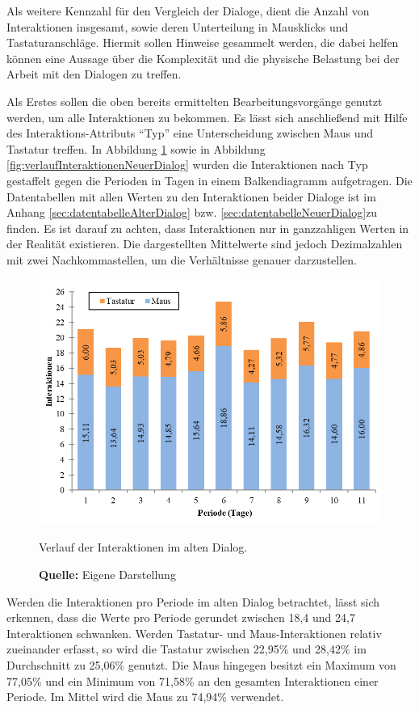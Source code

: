 Als weitere Kennzahl für den Vergleich der Dialoge, dient die Anzahl von Interaktionen insgesamt, sowie deren Unterteilung in Mausklicks und Tastaturanschläge. Hiermit sollen Hinweise gesammelt werden, die dabei helfen können eine Aussage über die Komplexität und die physische Belastung bei der Arbeit mit den Dialogen zu treffen.

Als Erstes sollen die oben bereits ermittelten Bearbeitungsvorgänge genutzt werden, um alle Interaktionen zu bekommen. Es lässt sich anschließend mit Hilfe des Interaktions-Attributs \enquote{Typ} eine Unterscheidung zwischen Maus und Tastatur treffen. In Abbildung \ref{fig:verlaufInteraktionenAlterDialog} sowie in Abbildung \ref{fig:verlaufInteraktionenNeuerDialog} wurden die Interaktionen nach Typ gestaffelt gegen die Perioden in Tagen in einem Balkendiagramm aufgetragen. Die Datentabellen mit allen Werten zu den Interaktionen beider Dialoge ist im Anhang \ref{sec:datentabelleAlterDialog} bzw. \ref{sec:datentabelleNeuerDialog}zu finden. Es ist darauf zu achten, dass Interaktionen nur in ganzzahligen Werten in der Realität existieren. Die dargestellten Mittelwerte sind jedoch Dezimalzahlen mit zwei Nachkommastellen, um die Verhältnisse genauer darzustellen.
\begin{figure}[H]
  \centering
  \includegraphics[]{img/Interaktionen_Alter_Dialog.png}
  \caption{Verlauf der Interaktionen im alten Dialog.}
  \caption*{\textbf{Quelle:} Eigene Darstellung}
  \label{fig:verlaufInteraktionenAlterDialog}
\end{figure}
Werden die Interaktionen pro Periode im alten Dialog betrachtet, lässt sich erkennen, dass die Werte pro Periode gerundet zwischen 18,4 und 24,7 Interaktionen schwanken. Werden Tastatur- und Maus-Interaktionen relativ zueinander erfasst, so wird die Tastatur zwischen 22,95\% und 28,42\% im Durchschnitt zu 25,06\% genutzt. Die Maus hingegen besitzt ein Maximum von 77,05\% und ein Minimum von 71,58\% an den gesamten Interaktionen einer Periode. Im Mittel wird die Maus zu 74,94\% verwendet.

